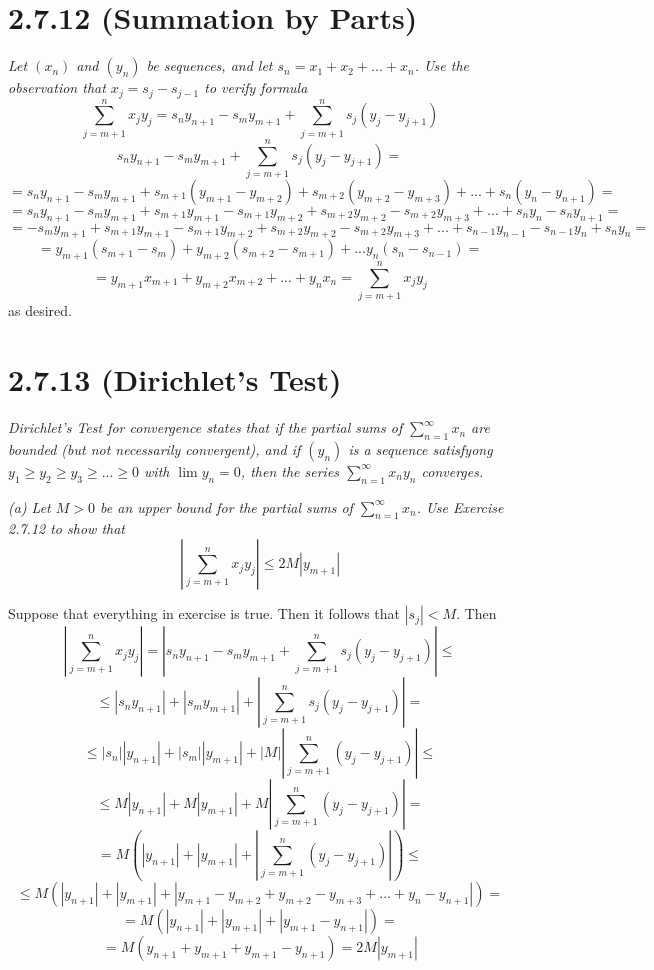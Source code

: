 \documentclass[11pt,oneside,titlepage]{book}
\begin{document}
\section*{2.7.12 (Summation by Parts)}
\textit{Let $(x_n)$ and $(y_n)$ be sequences, and let
  $s_n = x_1 + x_2 + ... + x_n$. Use the observation that
  $x_j = s_j - s_{j - 1}$ to verify formula }
$$\sum_{j = m + 1}^{n} x_j y_j = s_n y_{n + 1} - s_m y_{m + 1} +
\sum_{j = m + 1}^{n} s_j (y_j - y_{j + 1})$$
$$s_n y_{n + 1} - s_m y_{m + 1} +
\sum_{j = m + 1}^{n} s_j (y_j - y_{j + 1}) = $$
$$ = s_n y_{n + 1} - s_m y_{m + 1} +
s_{m + 1} (y_{m + 1} - y_{m + 2}) +
s_{m + 2} (y_{m + 2} - y_{m + 3}) +
... +
s_{n} (y_{n} - y_{n + 1}) = $$
$$ = s_n y_{n + 1} - s_m y_{m + 1} +
s_{m + 1} y_{m + 1} - s_{m + 1} y_{m + 2} +
s_{m + 2} y_{m + 2} - s_{m + 2} y_{m + 3} +
... +
s_{n} y_{n} - s_{n} y_{n + 1} = $$
$$ =  - s_m y_{m + 1} +
s_{m + 1} y_{m + 1} - s_{m + 1} y_{m + 2} +
s_{m + 2} y_{m + 2} - s_{m + 2} y_{m + 3} +
... + s_{n - 1} y_{n - 1} - s_{n - 1} y_{n}
+ s_{n} y_{n}  = $$
$$ =  y_{m + 1}(s_{m + 1} - s_m ) +
y_{m + 2}(s_{m + 2} - s_{m + 1} ) +
...   y_{n}( s_{n} - s_{n - 1})  = $$
$$ = y_{m + 1} x_{m + 1} +
y_{m + 2} x_{m + 2} + ... +
y_{n}x_n = \sum_{j = m + 1}^{n} x_j y_j
$$
as desired.

\section*{2.7.13 (Dirichlet's Test)}
\textit{Dirichlet's Test for convergence states that if the partial sums of
  $\sum_{n = 1}^{\infty} x_n$ are bounded (but not necessarily convergent), and
  if $(y_n)$ is a sequence satisfyong $y_1 \geq y_2 \geq y_3 \geq ... \geq 0 $
  with $\lim y_n = 0$, then the series $\sum_{n=1}^{\infty} x_n y_n$ converges.
}

\textit{(a) Let $M > 0$ be an upper bound for the partial sums of
  $\sum_{n = 1}^{\infty} x_n$. Use Exercise 2.7.12 to show that }
$$\left|\sum_{j = m + 1}^{n} x_j y_j\right| \leq 2M|y_{m + 1}|$$

Suppose that everything in exercise is true. Then it follows that
$|s_j| < M$. Then
$$\left|\sum_{j = m + 1}^{n} x_j y_j\right| =
\left|s_n y_{n + 1} - s_m y_{m + 1} + \sum_{j = m + 1}^{n}{s_j (y_j - y_{j + 1})} \right| \leq$$
$$\leq \left|s_n y_{n + 1}\right| + \left|s_m y_{m + 1}\right| + \left|\sum_{j = m + 1}^{n}{s_j (y_j - y_{j + 1})} \right| = $$
$$\leq |s_n| |y_{n + 1}| + |s_m|| y_{m + 1}| + |M|\left|\sum_{j = m + 1}^{n}{ (y_j - y_{j + 1})} \right| \leq $$
$$\leq M |y_{n + 1}| + M| y_{m + 1}| + M\left|\sum_{j = m + 1}^{n}{ (y_j - y_{j + 1})} \right| =$$
$$=  M \left(|y_{n + 1}| + | y_{m + 1}| + \left|\sum_{j = m + 1}^{n}{ (y_j - y_{j + 1})} \right|\right) \leq
$$
$$\leq  M \left(|y_{n + 1}| + | y_{m + 1}| + \left| y_{m + 1} - y_{m + 2} + y_{m + 2} - y_{m + 3} +  ... + y_n - y_{n + 1}\right|\right) =$$
$$=  M \left(|y_{n + 1}| + | y_{m + 1}| + \left| y_{m + 1} - y_{n + 1}\right|\right) = $$
$$=  M \left(y_{n + 1} +  y_{m + 1} + y_{m + 1} - y_{n + 1}\right) = 2M|y_{m + 1}|$$
\end{document}
